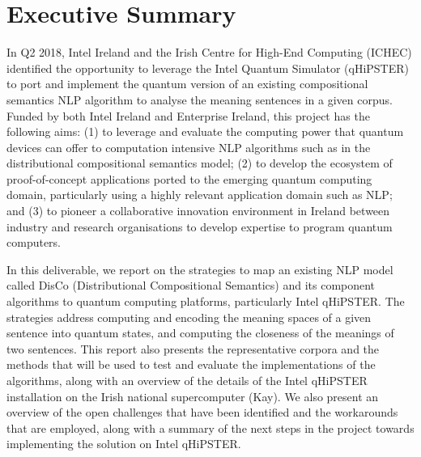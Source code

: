 \documentclass[11pt]{article}
\begin{document}
\section*{Executive Summary}
In Q2 2018, Intel Ireland and the Irish Centre for High-End Computing (ICHEC) identified the opportunity to leverage the Intel Quantum Simulator (qHiPSTER) to port and implement the quantum version of an existing compositional semantics NLP algorithm to analyse the meaning sentences in a given corpus. Funded by both Intel Ireland and Enterprise Ireland, this project has the following aims: (1) to leverage and evaluate the computing power that quantum devices can offer to computation intensive NLP algorithms such as in the distributional compositional semantics model; (2) to develop the ecosystem of proof-of-concept applications ported to the emerging quantum computing domain, particularly using a highly relevant application domain such as NLP; and (3) to pioneer a collaborative innovation environment in Ireland between industry and research organisations to develop expertise to program quantum computers.

In this deliverable, we report on the strategies to map an existing NLP model called DisCo (Distributional Compositional Semantics) and its component algorithms to quantum computing platforms, particularly Intel qHiPSTER. The strategies address computing and encoding the meaning spaces of a given sentence into quantum states, and computing the closeness of the meanings of two sentences. This report also presents the representative corpora and the methods that will be used to test and evaluate the implementations of the algorithms, along with an overview of the details of the Intel qHiPSTER installation on the Irish national supercomputer (Kay). We also present an overview of the open challenges that have been identified and the workarounds that are employed, along with a summary of the next steps in the project towards implementing the solution on Intel qHiPSTER.

\newpage
\tableofcontents
\newpage
\listoffigures
\listoftables

\newpage


\newpage

\end{document}
